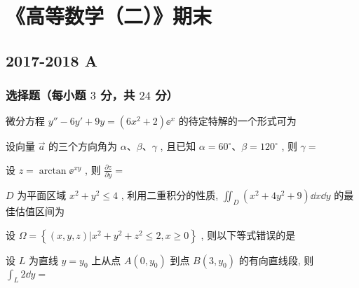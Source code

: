 \section{《高等数学（二）》期末}

\subsection{2017-2018 A}
\subsubsection{选择题（每小题 $3$ 分，共 $24$ 分）}
\begin{ti}
	微分方程 $y''-6 y'+9 y=\left(6 x^{2}+2\right) \ee^{x}$ 的待定特解的一个形式可为 \kuo
\end{ti}

\begin{ti}
	设向量 $\vec{a}$ 的三个方向角为 $\alpha$、$\beta$、$\gamma$ , 且已知 $\alpha=60^{\circ}$、$\beta=120^{\circ}$ , 则 $\gamma=$ \kuo
\end{ti}

\begin{ti}
	设 $z=\arctan \ee^{x y}$ , 则 $\frac{\partial z}{\partial y}=$ \kuo
\end{ti}

\begin{ti}
	$D$ 为平面区域 $x^{2}+y^{2} \leqslant 4$ , 利用二重积分的性质, $\iint_{D}\left(x^{2}+4 y^{2}+9\right) \dd{x} \dd{y}$ 的最佳估值区间为 \kuo
	\fourch{$[36 \uppi, 52 \uppi]$}{$[36 \uppi, 100 \uppi]$}{$[52 \uppi, 100 \uppi]$}{$[9 \uppi, 25 \uppi]$}
\end{ti}

\begin{ti}
	设 $\Omega=\left\{(x, y, z) | x^{2}+y^{2}+z^{2} \leqslant 2, x \geqslant 0\right\}$ , 则以下等式错误的是 \kuo
\end{ti}

\begin{ti}
	设 $L$ 为直线 $y=y_0$ 上从点 $A(0,y_0)$ 到点 $B(3,y_0)$ 的有向直线段, 则 $\int_{L} 2 \dd{y}=$ \kuo
\end{ti}

